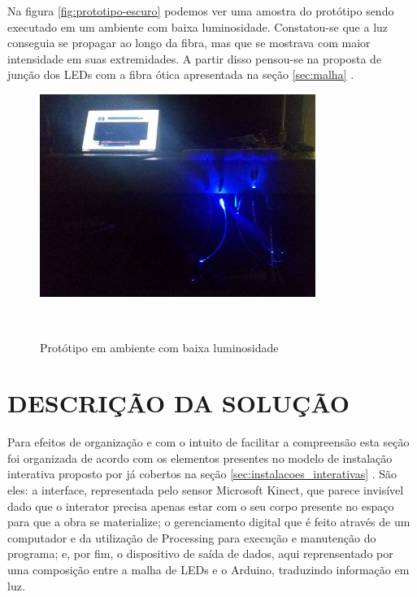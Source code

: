 Na figura \ref{fig:prototipo-escuro} podemos ver uma amostra do protótipo sendo executado em um ambiente com baixa luminosidade. Constatou-se que a luz conseguia se propagar ao longo da fibra, mas que se mostrava com maior intensidade em suas extremidades. A partir disso pensou-se na proposta de junção dos LEDs com a fibra ótica apresentada na seção \ref{sec:malha} .

\begin{figure}[H]
  \begin{center}
    \caption{Protótipo em ambiente com baixa luminosidade}
    \vspace*{0,2cm}
    \includegraphics[width=0.8\textwidth]{./04-figuras/prototipo_escuro}
    \label{fig:prototipo_escuro}
  \end{center}
  \vspace*{-0,5cm}
  \\
\end{figure}

\section{DESCRIÇÃO DA SOLUÇÃO}
\label{sec:solucao}

Para efeitos de organização e com o intuito de facilitar a compreensão esta seção foi organizada de acordo com os elementos presentes no modelo de instalação interativa proposto por \cite{sogabe2011} já cobertos na seção \ref{sec:instalacoes_interativas} . São eles: a interface, representada pelo sensor Microsoft Kinect, que parece invisível dado que o interator precisa apenas estar com o seu corpo presente no espaço para que a obra se materialize; o gerenciamento digital que é feito através de um computador e da utilização de Processing para execução e manutenção do programa; e, por fim, o dispositivo de saída de dados, aqui reprensentado por uma composição entre a malha de LEDs e o Arduino, traduzindo informação em luz.

